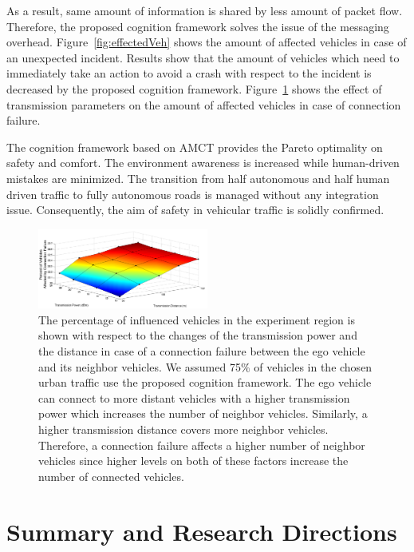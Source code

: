 \documentclass[journal, 11pt]{IEEEtran}
\begin{document}
As a result, same amount of information is shared by less amount of packet flow.
Therefore, the proposed cognition framework solves the issue of the messaging
overhead. Figure~\ref{fig:effectedVeh} shows the amount of affected vehicles in
case of an unexpected incident. Results show that the amount of vehicles
which need to immediately take an action to avoid a crash with respect to the
incident is decreased by the proposed cognition framework.
Figure~\ref{fig:urban3d} shows the effect of transmission parameters on the
amount of affected vehicles in case of connection failure.

The cognition framework based on AMCT provides the Pareto optimality on safety
and comfort. The environment awareness is increased while human-driven mistakes
are minimized. The transition from half autonomous and half human driven traffic
to fully autonomous roads is managed without any integration issue.
Consequently, the aim of safety in vehicular traffic is solidly confirmed.

\begin{figure}[tbh]
  \centering
  \includegraphics[width=0.5\textwidth]{figs/urban3d.png}
  \caption{{\fontsize{10}{10}\selectfont The percentage of influenced vehicles
  in the experiment region is shown with respect to the changes of the
  transmission power and the distance in case of a connection failure between
  the ego vehicle and its neighbor vehicles. We assumed 75$\%$ of vehicles in
  the chosen urban traffic use the proposed cognition framework. The ego vehicle
  can connect to more distant vehicles with a higher transmission power which  
  increases the number of neighbor vehicles. Similarly, a higher transmission
  distance covers more neighbor vehicles. Therefore, a connection failure
  affects a higher number of neighbor vehicles since higher levels on both of
  these factors increase the number of connected vehicles.}}
  \label{fig:urban3d}
\end{figure}

\section{Summary and Research Directions}
\label{Sec:Conc}
\end{document}
